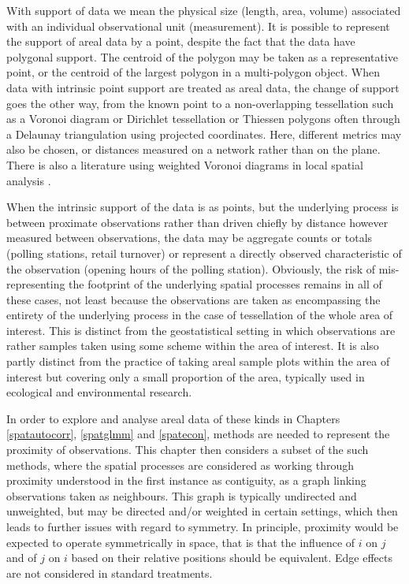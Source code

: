 \documentclass[]{book}
\begin{document}
With support of data we mean the physical size (length, area, volume) associated with an individual observational unit (measurement). It is possible to represent the support of areal data by a point, despite the fact that the data have polygonal support. The centroid of the polygon may be taken as a representative point, or the centroid of the largest polygon in a multi-polygon object. When data with intrinsic point support are treated as areal data, the change of support goes the other way, from the known point to a non-overlapping tessellation such as a Voronoi diagram or Dirichlet tessellation or Thiessen polygons often through a Delaunay triangulation using projected coordinates. Here, different metrics may also be chosen, or distances measured on a network rather than on the plane. There is also a literature using weighted Voronoi diagrams in local spatial analysis \citep[see for example][]{doi:10.1080/13658810601034267, doi:10.1080/13658810701587891, SHE201570}.

When the intrinsic support of the data is as points, but the underlying process is between proximate observations rather than driven chiefly by distance however measured between observations, the data may be aggregate counts or totals (polling stations, retail turnover) or represent a directly observed characteristic of the observation (opening hours of the polling station). Obviously, the risk of mis-representing the footprint of the underlying spatial processes remains in all of these cases, not least because the observations are taken as encompassing the entirety of the underlying process in the case of tessellation of the whole area of interest. This is distinct from the geostatistical setting in which observations are rather samples taken using some scheme within the area of interest. It is also partly distinct from the practice of taking areal sample plots within the area of interest but covering only a small proportion of the area, typically used in ecological and environmental research.

In order to explore and analyse areal data of these kinds in Chapters \ref{spatautocorr}, \ref{spatglmm} and \ref{spatecon}, methods are needed to represent the proximity of observations. This chapter then considers a subset of the such methods, where the spatial processes are considered as working through proximity understood in the first instance as contiguity, as a graph linking observations taken as neighbours. This graph is typically undirected and unweighted, but may be directed and/or weighted in certain settings, which then leads to further issues with regard to symmetry. In principle, proximity would be expected to operate symmetrically in space, that is that the influence of \(i\) on \(j\) and of \(j\) on \(i\) based on their relative positions should be equivalent. Edge effects are not considered in standard treatments.
\end{document}
